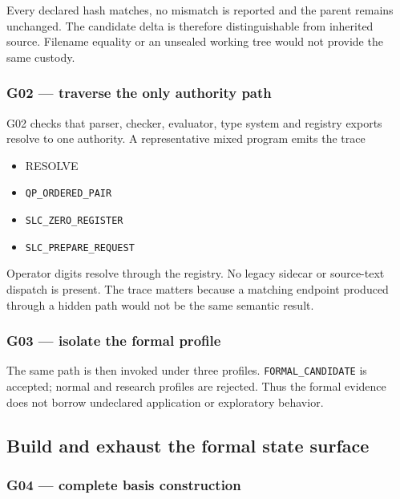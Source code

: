 Every declared hash matches, no mismatch is reported and the parent
remains unchanged. The candidate delta is therefore distinguishable from
inherited source. Filename equality or an unsealed working tree would
not provide the same custody.

\subsubsection{G02 --- traverse the only authority
path}\label{viii-ch02-g02-traverse-the-only-authority-path}

G02 checks that parser, checker, evaluator, type system and registry
exports resolve to one authority. A representative mixed program emits
the trace

\begin{itemize}
\tightlist
\item
  RESOLVE
\item
  \nolinkurl{QP_ORDERED_PAIR}
\item
  \nolinkurl{SLC_ZERO_REGISTER}
\item
  \nolinkurl{SLC_PREPARE_REQUEST}
\end{itemize}

Operator digits resolve through the registry. No legacy sidecar or
source-text dispatch is present. The trace matters because a matching
endpoint produced through a hidden path would not be the same semantic
result.

\subsubsection{G03 --- isolate the formal
profile}\label{viii-ch02-g03-isolate-the-formal-profile}

The same path is then invoked under three profiles.
\texttt{FORMAL\_CANDIDATE} is accepted; normal and research profiles are
rejected. Thus the formal evidence does not borrow undeclared
application or exploratory behavior.

\subsection{Build and exhaust the formal state
surface}\label{viii-ch02-build-and-exhaust-the-formal-state-surface}

\subsubsection{G04 --- complete basis
construction}\label{viii-ch02-g04-complete-basis-construction}

